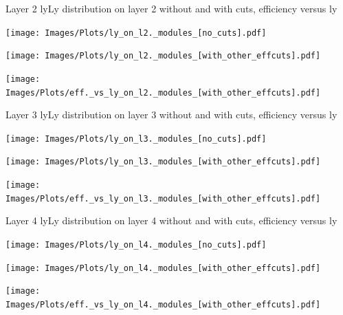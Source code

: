 \documentclass{beamer}
\begin{document}
\begin{frame}{Layer 2 ly}{Ly distribution on layer 2 without and with cuts, efficiency versus ly}
\begin{minipage}{0.32\textwidth}
  \centering
  \texttt{[image: Images/Plots/ly\_on\_l2.\_modules\_[no\_cuts].pdf]}
\end{minipage}%
\hspace{0.01\textwidth}%
\begin{minipage}{0.32\textwidth}
  \centering
  \texttt{[image: Images/Plots/ly\_on\_l2.\_modules\_[with\_other\_effcuts].pdf]}
\end{minipage}%
\hspace{0.01\textwidth}%
\begin{minipage}{0.32\textwidth}
  \centering
  \texttt{[image: Images/Plots/eff.\_vs\_ly\_on\_l2.\_modules\_[with\_other\_effcuts].pdf]}
\end{minipage}
\end{frame}

\begin{frame}{Layer 3 ly}{Ly distribution on layer 3 without and with cuts, efficiency versus ly}
\begin{minipage}{0.32\textwidth}
  \centering
  \texttt{[image: Images/Plots/ly\_on\_l3.\_modules\_[no\_cuts].pdf]}
\end{minipage}%
\hspace{0.01\textwidth}%
\begin{minipage}{0.32\textwidth}
  \centering
  \texttt{[image: Images/Plots/ly\_on\_l3.\_modules\_[with\_other\_effcuts].pdf]}
\end{minipage}%
\hspace{0.01\textwidth}%
\begin{minipage}{0.32\textwidth}
  \centering
  \texttt{[image: Images/Plots/eff.\_vs\_ly\_on\_l3.\_modules\_[with\_other\_effcuts].pdf]}
\end{minipage}
\end{frame}

\begin{frame}{Layer 4 ly}{Ly distribution on layer 4 without and with cuts, efficiency versus ly}
\begin{minipage}{0.32\textwidth}
  \centering
  \texttt{[image: Images/Plots/ly\_on\_l4.\_modules\_[no\_cuts].pdf]}
\end{minipage}%
\hspace{0.01\textwidth}%
\begin{minipage}{0.32\textwidth}
  \centering
  \texttt{[image: Images/Plots/ly\_on\_l4.\_modules\_[with\_other\_effcuts].pdf]}
\end{minipage}%
\hspace{0.01\textwidth}%
\begin{minipage}{0.32\textwidth}
  \centering
  \texttt{[image: Images/Plots/eff.\_vs\_ly\_on\_l4.\_modules\_[with\_other\_effcuts].pdf]}
\end{minipage}
\end{frame}
\end{document}
